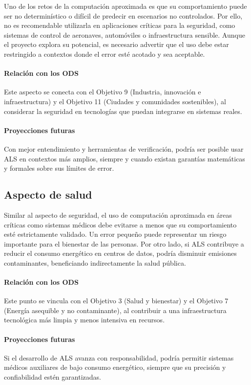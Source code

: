 Uno de los retos de la computación aproximada es que su comportamiento puede
ser no determinístico o difícil de predecir en escenarios no controlados. Por
ello, no es recomendable utilizarla en aplicaciones críticas para la seguridad,
como sistemas de control de aeronaves, automóviles o infraestructura sensible.
Aunque el proyecto explora su potencial, es necesario advertir que el uso debe
estar restringido a contextos donde el error esté acotado y sea aceptable.

\paragraph{Relación con los ODS}
Este aspecto se conecta con el Objetivo 9 (Industria, innovación e
infraestructura) y el Objetivo 11 (Ciudades y comunidades sostenibles), al
considerar la seguridad en tecnologías que puedan integrarse en sistemas
reales.

\paragraph{Proyecciones futuras}
Con mejor entendimiento y herramientas de verificación, podría ser posible usar
ALS en contextos más amplios, siempre y cuando existan garantías matemáticas y
formales sobre sus límites de error.

\subsection{Aspecto de salud}

Similar al aspecto de seguridad, el uso de computación aproximada en áreas
críticas como sistemas médicos debe evitarse a menos que su comportamiento esté
estrictamente validado. Un error pequeño puede representar un riesgo importante
para el bienestar de las personas. Por otro lado, si ALS contribuye a reducir
el consumo energético en centros de datos, podría disminuir emisiones
contaminantes, beneficiando indirectamente la salud pública.

\paragraph{Relación con los ODS}
Este punto se vincula con el Objetivo 3 (Salud y bienestar) y el Objetivo 7
(Energía asequible y no contaminante), al contribuir a una infraestructura
tecnológica más limpia y menos intensiva en recursos.

\paragraph{Proyecciones futuras}
Si el desarrollo de ALS avanza con responsabilidad, podría permitir sistemas
médicos auxiliares de bajo consumo energético, siempre que su precisión y
confiabilidad estén garantizadas.

